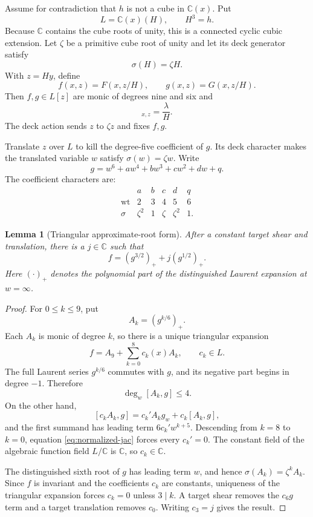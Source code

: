\documentclass[11pt]{article}
\newtheorem{lemma}[theorem]{Lemma}
\theoremstyle{definition}
\theoremstyle{remark}
\newcommand{\C}{\mathbb C}
\newcommand{\wt}{\operatorname{wt}}
\begin{document}
Assume for contradiction that \(h\) is not a cube in \(\C(x)\).  Put
\[
 L=\C(x)(H),\qquad H^3=h.
\]
Because \(\C\) contains the cube roots of unity, this is a connected
cyclic cubic extension.  Let \(\zeta\) be a primitive cube root of
unity and let its deck generator satisfy
\[
 \sigma(H)=\zeta H.
\]
With \(z=Hy\), define
\[
 f(x,z)=F(x,z/H),\qquad g(x,z)=G(x,z/H).
\]
Then \(f,g\in L[z]\) are monic of degrees nine and six and
\begin{equation}
 [f,g]_{x,z}=\frac{\lambda}{H}.
\label{eq:normalized-jac}
\end{equation}
The deck action sends \(z\) to \(\zeta z\) and fixes \(f,g\).

Translate \(z\) over \(L\) to kill the degree-five coefficient of
\(g\).  Its deck character makes the translated variable \(w\) satisfy
\(\sigma(w)=\zeta w\).  Write
\begin{equation}
 g=w^6+aw^4+bw^3+cw^2+dw+q.
\label{eq:g}
\end{equation}
The coefficient characters are:
\[
\begin{array}{c|ccccc}
 &a&b&c&d&q\\ \hline
 \wt&2&3&4&5&6\\
 \sigma&\zeta^2&1&\zeta&\zeta^2&1.
\end{array}
\]

\begin{lemma}[Triangular approximate-root form]
\label{lem:approx}
After a constant target shear and translation, there is a
\(j\in\C\) such that
\[
 \boxed{f=(g^{3/2})_+ +j(g^{1/2})_+.}
\]
Here \((\cdot)_+\) denotes the polynomial part of the distinguished
Laurent expansion at \(w=\infty\).
\end{lemma}

\begin{proof}
For \(0\leq k\leq9\), put
\[
 A_k=(g^{k/6})_+.
\]
Each \(A_k\) is monic of degree \(k\), so there is a unique triangular
expansion
\[
 f=A_9+\sum_{k=0}^8c_k(x)A_k,\qquad c_k\in L.
\]
The full Laurent series \(g^{k/6}\) commutes with \(g\), and its
negative part begins in degree \(-1\).  Therefore
\[
 \deg_w[A_k,g]\leq4.
\]
On the other hand,
\[
 [c_kA_k,g]=c_k'A_kg_w+c_k[A_k,g],
\]
and the first summand has leading term \(6c_k'w^{k+5}\).
Descending from \(k=8\) to \(k=0\), equation
\eqref{eq:normalized-jac} forces every \(c_k'=0\).  The constant field
of the algebraic function field \(L/\C\) is \(\C\), so \(c_k\in\C\).

The distinguished sixth root of \(g\) has leading term \(w\), and hence
\(\sigma(A_k)=\zeta^kA_k\).  Since \(f\) is invariant and the
coefficients \(c_k\) are constants, uniqueness of the triangular
expansion forces \(c_k=0\) unless \(3\mid k\).  A target shear removes
the \(c_6g\) term and a target translation removes \(c_0\).  Writing
\(c_3=j\) gives the result.
\end{proof}
\end{document}
